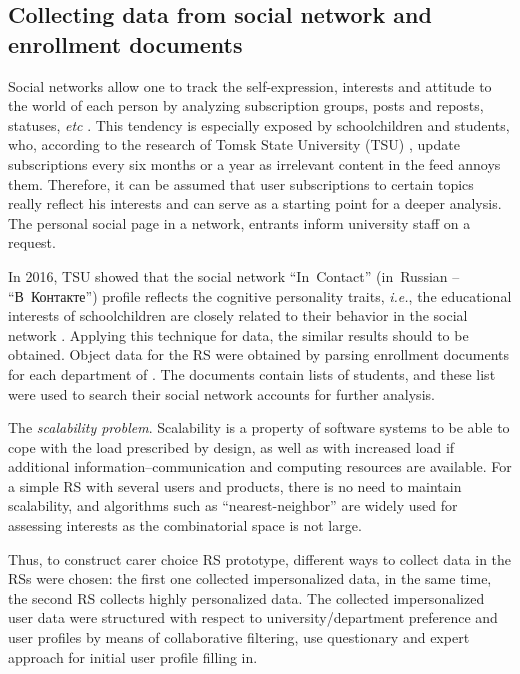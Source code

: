 \documentclass[conference,a4]{IEEEtran}
\begin{document}
\subsection{Collecting data from social network and enrollment documents}
\label{sec:collect-2}

Social networks allow one to track the self-expression, interests and attitude to the world of each person by analyzing subscription groups, posts and reposts, statuses, \emph{etc} \cite{kb7}.  This tendency is especially exposed by schoolchildren and students, who, according to the research of Tomsk State University (TSU) \cite{kb20}, update subscriptions every six months or a year as irrelevant content in the feed annoys them. Therefore, it can be assumed that user subscriptions to certain topics really reflect his interests and can serve as a starting point for a deeper analysis.  The personal social page in a network, entrants inform university staff on a request.

In 2016, TSU showed that the social network ``In~Contact'' (in~Russian -- ``В~Контакте'') profile reflects the cognitive personality traits, \emph{i.e.}, the educational interests of schoolchildren are closely related to their behavior in the social network \cite{kb9}.  Applying this technique for \irnitu{} data, the similar results should to be obtained.  Object data for the RS were obtained by parsing enrollment documents for each department of \irnitu.  The documents contain lists of students, and these list were used to search their social network accounts for further analysis.

\vspace{0.7em}

The \emph{scalability problem}. Scalability is a property of software systems to be able to cope with the load prescribed by design, as well as with increased load if additional information--communication and computing resources are available.  For a simple RS with several users and products, there is no need to maintain scalability, and algorithms such as ``nearest-neighbor'' are widely used for assessing interests as the combinatorial space is not large. %

Thus, to construct carer choice RS prototype, different ways to collect data in the RSs were chosen: the first one collected impersonalized data, in the same time, the second RS collects highly personalized data.  The collected impersonalized user data were structured with respect to university/department preference and user profiles by means of collaborative filtering, use questionary and expert approach for initial user profile filling in.
\end{document}
